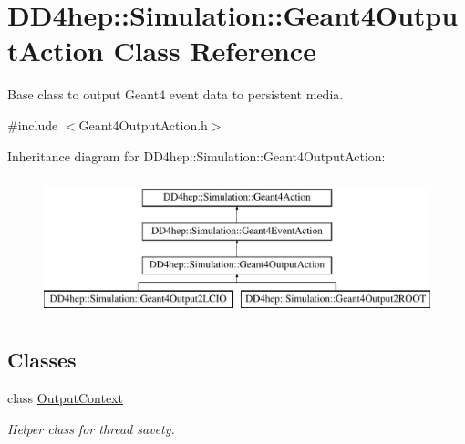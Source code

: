 \hypertarget{class_d_d4hep_1_1_simulation_1_1_geant4_output_action}{}\section{D\+D4hep\+:\+:Simulation\+:\+:Geant4\+Output\+Action Class Reference}
\label{class_d_d4hep_1_1_simulation_1_1_geant4_output_action}


Base class to output Geant4 event data to persistent media.  




{\ttfamily \#include $<$Geant4\+Output\+Action.\+h$>$}

Inheritance diagram for D\+D4hep\+:\+:Simulation\+:\+:Geant4\+Output\+Action\+:\begin{figure}[H]
\begin{center}
\leavevmode
\includegraphics[height=4.000000cm]{class_d_d4hep_1_1_simulation_1_1_geant4_output_action}
\end{center}
\end{figure}
\subsection*{Classes}
\begin{DoxyCompactItemize}
\item 
class \hyperlink{class_d_d4hep_1_1_simulation_1_1_geant4_output_action_1_1_output_context}{Output\+Context}
\begin{DoxyCompactList}\small\item\em Helper class for thread savety. \end{DoxyCompactList}\end{DoxyCompactItemize}
